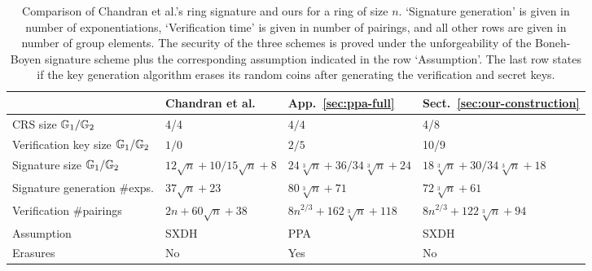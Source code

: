 
\begin{table}[h]
\begin{center}
\begin{minipage}{\textwidth}
\begin{center}
\begin{scriptsize}
\begin{tabular}{l|l|l|l}
                                           & Chandran et al.~\cite{ICALP:ChaGroSah07} & App.~\ref{sec:ppa-full} &  Sect.~\ref{sec:our-construction} \\
\hline%
\rule{0pt}{2.5ex}CRS size  $\mathbb{G}_1/\mathbb{G}_2$              & 4/4                                      & $4/4$  & 4/8    \\
\rule{0pt}{2.5ex}Verification key size $\mathbb{G}_1/\mathbb{G}_2$    & $1/0$                                       & $2/5$  &   10/9  \\
\rule{0pt}{2.5ex}Signature size      $\mathbb{G}_1/\mathbb{G}_2$      & $12\sqrt{n}+10/15\sqrt{n}+8$                        & $24\sqrt[3]{n} + 36/34\sqrt[3]{n} + 24$& $18\sqrt[3]{n} + 30/34\sqrt[3]{n} + 18$\\
\rule{0pt}{2.5ex}Signature generation \#exps. & $37\sqrt{n}+23$                        & $80\sqrt[3]{n}+71$&$72\sqrt[3]{n}+61$\\
\rule{0pt}{2.5ex}Verification \#pairings         & $2n + 60\sqrt{n}+38$                & $8n^{2/3} + 162\sqrt[3]{n} + 118$&$8n^{2/3} + 122\sqrt[3]{n} + 94$\\
\rule{0pt}{2.5ex}Assumption         & SXDH                & PPA & SXDH\\
\rule{0pt}{2.5ex}Erasures         & No                & Yes & No\\
\end{tabular}
\end{scriptsize}
\end{center}
\caption{Comparison of Chandran et al.'s ring signature and ours for a ring of size $n$. `Signature generation' is given in number of exponentiations, `Verification time' is given in number of pairings, and all other rows are given in number of group elements. The security of the three schemes is proved under the unforgeability of the Boneh-Boyen signature scheme plus the corresponding assumption indicated in the row `Assumption'.
The last row states if the key generation algorithm erases its random coins after generating the verification and secret keys.
\label{table:eff}}
\end{minipage}
\end{center}
\end{table}
